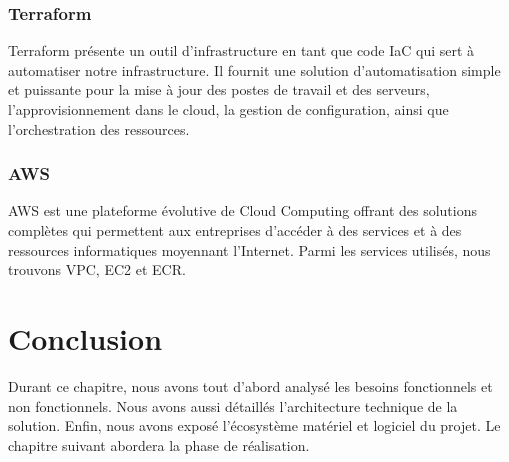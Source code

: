 \subsubsection{Terraform}
Terraform présente un outil d'infrastructure en tant que code IaC qui sert à automatiser notre infrastructure. Il fournit une solution d’automatisation simple et puissante pour la mise à jour des postes de travail et des serveurs, l'approvisionnement dans le cloud, la gestion de configuration, ainsi que l’orchestration des ressources.

\subsubsection{AWS}
AWS est une plateforme évolutive de Cloud Computing offrant des solutions complètes qui permettent aux entreprises d'accéder à des services et à des ressources informatiques moyennant l'Internet. Parmi les services utilisés, nous trouvons VPC, EC2 et ECR.

\section*{Conclusion}
Durant ce chapitre, nous avons tout d’abord analysé les besoins fonctionnels et non fonctionnels. Nous avons aussi détaillés l’architecture technique de la solution. Enfin, nous avons exposé l'écosystème matériel et logiciel du projet. Le chapitre suivant abordera la phase de réalisation.
